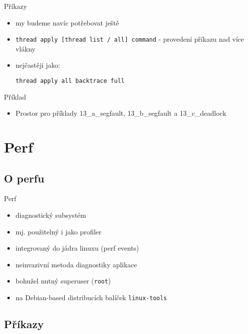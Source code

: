 \documentclass{beamer}
\begin{document}
\begin{xframe}{Příkazy}
	\begin{itemize}
		\item my budeme navíc potřebovat ještě
		\item \texttt{thread apply [thread list / all] command} - provedení příkazu nad více vlákny
		\item nejčastěji jako:
\begin{lstlisting}[basicstyle=\fontsize{8}{9}\selectfont\ttfamily]
thread apply all backtrace full
\end{lstlisting}
	\end{itemize}
\end{xframe}

\begin{xframe}{Příklad}
	\begin{itemize}
		\item Prostor pro příklady 13\_a\_segfault, 13\_b\_segfault a 13\_c\_deadlock
	\end{itemize}
\end{xframe}

\section{Perf}
\subsection{O perfu}

\begin{xframe}{Perf}
	\begin{itemize}
		\item diagnostický subsystém
		\item mj. použitelný i jako profiler
		\item integrovaný do jádra linuxu (perf events)
		\item neinvazivní metoda diagnostiky aplikace
		\item bohužel nutný superuser (\texttt{root})
		\item na Debian-based distribucích balíček \texttt{linux-tools}
	\end{itemize}
\end{xframe}

\subsection{Příkazy}
\end{document}
